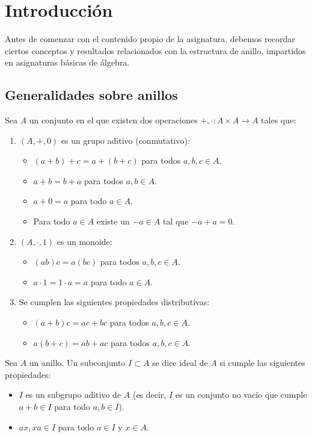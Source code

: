 \section{Introducción}
Antes de comenzar con el contenido propio de la asignatura, debemos recordar
ciertos conceptos y resultados relacionados con la estructura de anillo,
impartidos en asignaturas básicas de álgebra.
\subsection{Generalidades sobre anillos}
\begin{df}[Anillo]
  Sea \(A\) un conjunto en el que existen dos operaciones
  \(+,\cdot:A\times A\longrightarrow A\) tales que:
  \begin{enumerate}
    \item \((A, +,0)\) es un grupo aditivo (conmutativo):
      \begin{itemize}
        \item \((a+b)+c=a+(b+c)\) para todos \(a,b,c\in A\).
        \item \(a+b=b+a\) para todos \(a,b\in A\).
        \item \(a+0=a\) para todo \(a\in A\).
        \item Para todo \(a\in A\) existe un \(-a\in A\)
          tal que \(-a+a=0\).
      \end{itemize}
    \item \((A, \cdot, 1)\) es un monoide:
      \begin{itemize}
        \item \((ab)c=a(bc)\) para todos \(a,b,c\in A\).
        \item \(a\cdot 1=1\cdot a=a\) para todo \(a\in A\).
      \end{itemize}
    \item Se cumplen las siguientes propiedades distributivas:
      \begin{itemize}
        \item \((a+b)c=ac+bc\) para todos \(a,b,c\in A\).
        \item \(a(b+c)=ab+ac\) para todos \(a,b,c\in A\).
      \end{itemize}
     \end{enumerate}
  \end{df}

  \begin{df}[Ideales]
    Sea \(A\) un anillo. Un subconjunto \(I\subset A\) se dice ideal de \(A\)
    si cumple las siguientes propiedades:
    \begin{itemize}
      \item \(I\) es un subgrupo aditivo de \(A\) (es decir,
        \(I\) es un conjunto no vacío que cumple
        \(a + b\in I\) para todo \(a, b\in I\)).
      \item \(ax, xa\in I\) para todo \(a\in I\) y \(x \in A\).
    \end{itemize}
  \end{df}

